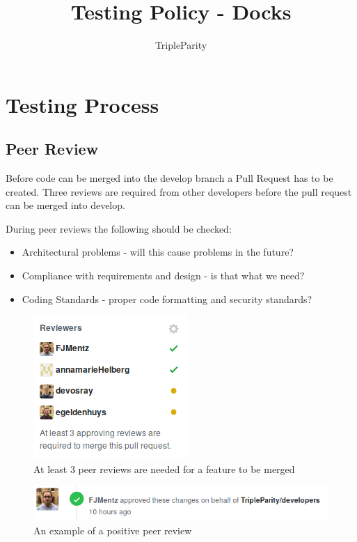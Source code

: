 \documentclass[]{article}
\title{Testing Policy - Docks}
\author{TripleParity}
\date{}
\begin{document}
\maketitle

\tableofcontents

\section{Testing Process}

\subsection{Peer Review}
Before code can be merged into the develop branch a Pull Request has to be created.
Three reviews are required from other developers before the pull request
can be merged into develop.

During peer reviews the following should be checked:
\begin{itemize}
	\item Architectural problems - will this cause problems in the future?
	\item Compliance with requirements and design - is that what we need?
	\item Coding Standards - proper code formatting and security standards?
\end{itemize}

\begin{figure}[H]
	\centering
	\includegraphics[scale=0.5]{github_3_reviews_required.png}
	\caption{At least 3 peer reviews are needed for a feature to be merged}
\end{figure}

\begin{figure}[H]
	\centering
	\includegraphics[scale=0.5]{github_approved_review.png}
	\caption{An example of a positive peer review}
\end{figure}
\end{document}
